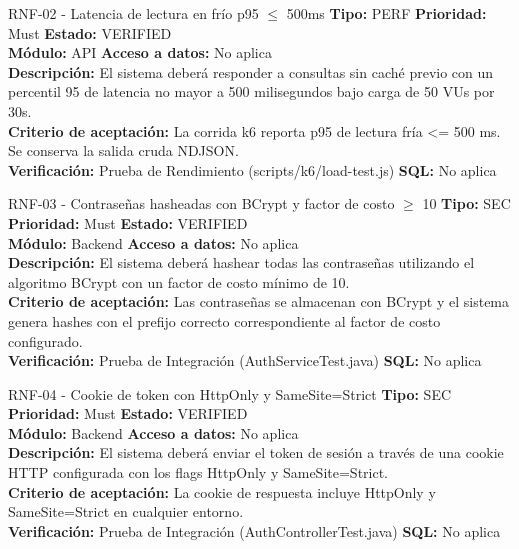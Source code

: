 \documentclass[11pt,a4paper]{article}
\begin{document}
\begin{requisito}{RNF-02 - Latencia de lectura en frío p95 $\le$ 500ms}
    \textbf{Tipo:} PERF \quad \textbf{Prioridad:} Must \quad \textbf{Estado:} VERIFIED \\[0.2cm]
    \textbf{Módulo:} API \quad \textbf{Acceso a datos:} No aplica \\[0.2cm]
    \textbf{Descripción:} El sistema deberá responder a consultas sin caché previo con un percentil 95 de latencia no mayor a 500 milisegundos bajo carga de 50 VUs por 30s. \\[0.2cm]
    \textbf{Criterio de aceptación:} La corrida k6 reporta p95 de lectura fría <= 500 ms. Se conserva la salida cruda NDJSON. \\[0.2cm]
    \textbf{Verificación:} Prueba de Rendimiento (scripts/k6/load-test.js) \quad \textbf{SQL:} No aplica
\end{requisito}

\begin{requisito}{RNF-03 - Contraseñas hasheadas con BCrypt y factor de costo $\ge$ 10}
    \textbf{Tipo:} SEC \quad \textbf{Prioridad:} Must \quad \textbf{Estado:} VERIFIED \\[0.2cm]
    \textbf{Módulo:} Backend \quad \textbf{Acceso a datos:} No aplica \\[0.2cm]
    \textbf{Descripción:} El sistema deberá hashear todas las contraseñas utilizando el algoritmo BCrypt con un factor de costo mínimo de 10. \\[0.2cm]
    \textbf{Criterio de aceptación:} Las contraseñas se almacenan con BCrypt y el sistema genera hashes con el prefijo correcto correspondiente al factor de costo configurado. \\[0.2cm]
    \textbf{Verificación:} Prueba de Integración (AuthServiceTest.java) \quad \textbf{SQL:} No aplica
\end{requisito}

\begin{requisito}{RNF-04 - Cookie de token con HttpOnly y SameSite=Strict}
    \textbf{Tipo:} SEC \quad \textbf{Prioridad:} Must \quad \textbf{Estado:} VERIFIED \\[0.2cm]
    \textbf{Módulo:} Backend \quad \textbf{Acceso a datos:} No aplica \\[0.2cm]
    \textbf{Descripción:} El sistema deberá enviar el token de sesión a través de una cookie HTTP configurada con los flags HttpOnly y SameSite=Strict. \\[0.2cm]
    \textbf{Criterio de aceptación:} La cookie de respuesta incluye HttpOnly y SameSite=Strict en cualquier entorno. \\[0.2cm]
    \textbf{Verificación:} Prueba de Integración (AuthControllerTest.java) \quad \textbf{SQL:} No aplica
\end{requisito}
\end{document}
